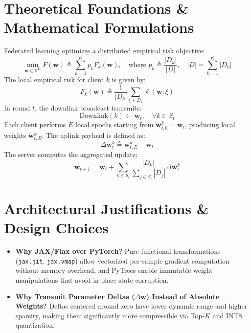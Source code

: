 \documentclass[11pt,a4paper,titlepage]{report}
\begin{document}
\section{Theoretical Foundations \& Mathematical Formulations}
\begin{mathfoundation}
Federated learning optimizes a distributed empirical risk objective:
\begin{equation}
    \min_{\mathbf{w} \in \mathbb{R}^D} F(\mathbf{w}) \triangleq \sum_{k=1}^K p_k F_k(\mathbf{w}), \quad \text{where } p_k \triangleq \frac{|D_k|}{|D|}, \quad |D| = \sum_{k=1}^K |D_k|
\end{equation}
The local empirical risk for client $k$ is given by:
\begin{equation}
    F_k(\mathbf{w}) \triangleq \frac{1}{|D_k|} \sum_{\xi \in D_k} \ell(\mathbf{w}; \xi)
\end{equation}
In round $t$, the downlink broadcast transmits:
\begin{equation}
    \text{Downlink}(k) \gets \mathbf{w}_t, \quad \forall k \in S_t
\end{equation}
Each client performs $E$ local epochs starting from $\mathbf{w}_{t, 0}^k = \mathbf{w}_t$, producing local weights $\mathbf{w}_{t, E}^k$. The uplink payload is defined as:
\begin{equation}
    \Delta\mathbf{w}_t^k \triangleq \mathbf{w}_{t, E}^k - \mathbf{w}_t
\end{equation}
The server computes the aggregated update:
\begin{equation}
    \mathbf{w}_{t+1} = \mathbf{w}_t + \sum_{k \in S_t} \frac{|D_k|}{\sum_{j \in S_t} |D_j|} \Delta\mathbf{w}_t^k
\end{equation}
\end{mathfoundation}

\section{Architectural Justifications \& Design Choices}
\begin{itemize}[leftmargin=*]
    \item \textbf{Why JAX/Flax over PyTorch?} Pure functional transformations (\texttt{jax.jit}, \texttt{jax.vmap}) allow vectorized per-sample gradient computation without memory overhead, and PyTrees enable immutable weight manipulations that avoid in-place state corruption.
    \item \textbf{Why Transmit Parameter Deltas ($\Delta\mathbf{w}$) Instead of Absolute Weights?} Deltas centered around zero have lower dynamic range and higher sparsity, making them significantly more compressible via Top-$K$ and INT8 quantization.
\end{itemize}
\end{document}
